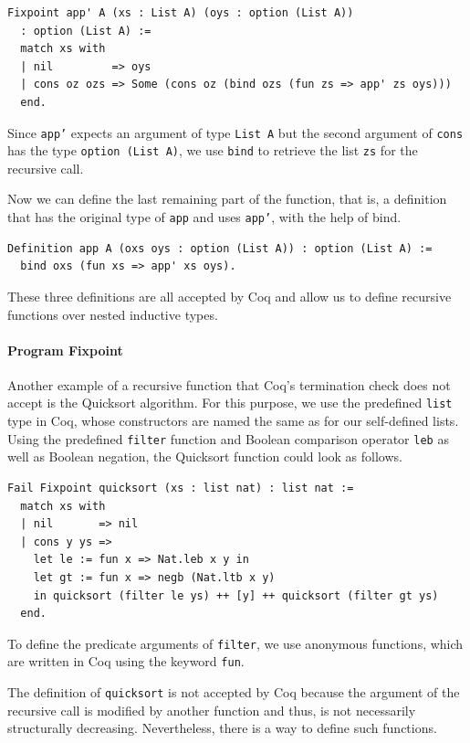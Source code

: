 \documentclass[a4paper, 11pt, fleqn, twoside, abstract=on]{scrreprt}
\newcommand{\cinl}[1]{\texttt{#1}}
\begin{document}
\begin{verbatim}
Fixpoint app' A (xs : List A) (oys : option (List A)) 
  : option (List A) :=
  match xs with
  | nil         => oys
  | cons oz ozs => Some (cons oz (bind ozs (fun zs => app' zs oys)))
  end.
\end{verbatim}
\noindent
Since \cinl{app'} expects an argument of type \cinl{List A} but the second argument of \cinl{cons} has the type \cinl{option (List A)}, we use \cinl{bind} to retrieve the list \cinl{zs} for the recursive call.

Now we can define the last remaining part of the function, that is, a definition that has the original type of \cinl{app} and uses \cinl{app'}, with the help of bind.

\begin{verbatim}
Definition app A (oxs oys : option (List A)) : option (List A) :=
  bind oxs (fun xs => app' xs oys).
\end{verbatim}
\noindent
These three definitions are all accepted by Coq and allow us to define recursive functions over nested inductive types.

\paragraph{Program Fixpoint}
Another example of a recursive function that Coq's termination check does not accept is the Quicksort algorithm.
For this purpose, we use the predefined \cinl{list} type in Coq, whose constructors are named the same as for our self-defined lists.
Using the predefined \cinl{filter} function and Boolean comparison operator \cinl{leb} as well as Boolean negation, the Quicksort function could look as follows.

\begin{verbatim}
Fail Fixpoint quicksort (xs : list nat) : list nat :=
  match xs with
  | nil       => nil
  | cons y ys =>
    let le := fun x => Nat.leb x y in
    let gt := fun x => negb (Nat.ltb x y)
    in quicksort (filter le ys) ++ [y] ++ quicksort (filter gt ys)
  end.
\end{verbatim}
\noindent
To define the predicate arguments of \cinl{filter}, we use anonymous functions, which are written in Coq using the keyword \cinl{fun}.

The definition of \cinl{quicksort} is not accepted by Coq because the argument of the recursive call is modified by another function and thus, is not necessarily structurally decreasing.
Nevertheless, there is a way to define such functions.
\end{document}
